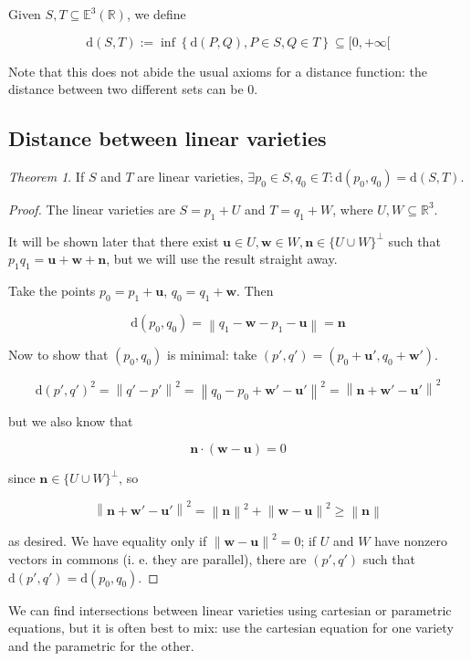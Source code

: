 \documentclass[12pt,a4paper]{report}
\newcommand{\norm}[1]{\left\lVert#1\right\rVert}
\numberwithin{equation}{section}
\theoremstyle{definition}
\theoremstyle{remark}
\newtheorem{theorem}{Theorem}[section]
\begin{document}
Given $S, T \subseteq \mathbb{E}^3 (\mathbb{R})$, we define

\begin{equation}
\text{d} (S, T) := \inf \left\lbrace \text{d} (P, Q), P \in S, Q \in T\right\rbrace \subseteq [0, +\infty [
\end{equation}

Note that this does not abide the usual axioms for a distance function: the distance between two different sets can be 0.

\subsection{Distance between linear varieties}

\begin{theorem}
If $S$ and $T$ are linear varieties, $\exists p_0 \in S, q_0 \in T : \text{d} (p_0, q_0) = \text{d} (S, T)$.
\end{theorem}

\begin{proof}
The linear varieties are $S = p_1 + U$ and  $T= q_1 + W$, where $U, W \subseteq \mathbb{R}^3$.

It will be shown later that there exist $\mathbf{u} \in U, \mathbf{w} \in W, \mathbf{n} \in \lbrace U \cup W \rbrace ^\perp$ such that $p_1 q_1 = \mathbf{u} + \mathbf{w} + \mathbf{n}$, but we will use the result straight away.

Take the points $p_0 = p_1 + \mathbf{u}$, $q_0 = q_1 + \mathbf{w}$. Then

\begin{equation}
\text{d}(p_0, q_0) = \norm{q_1 - \mathbf{w} - p_1 - \mathbf{u}} = \mathbf{n}
\end{equation}

Now to show that $(p_0, q_0)$ is minimal: take $(p', q') = (p_0 + \mathbf{u}', q_0 + \mathbf{w}')$.

\begin{equation}
\text{d}(p', q')^2 = \norm{q'-p'}^2 = \norm{q_0 - p_0 + \mathbf{w}' - \mathbf{u}'}^2 = \norm{\mathbf{n} + \mathbf{w}' - \mathbf{u}'}^2 
\end{equation}

but we also know that

\begin{equation}
\mathbf{n} \cdot (\mathbf{w} - \mathbf{u}) = 0
\end{equation}

since $\mathbf{n} \in \lbrace U \cup W \rbrace ^\perp$, so

\begin{equation}
\norm{\mathbf{n} + \mathbf{w}' - \mathbf{u}'}^2 = \norm{\mathbf{n}}^2 + \norm{\mathbf{w} -\mathbf{u}}^2 \geq \norm{\mathbf{n}}
\end{equation}

as desired. We have equality only if $\norm{\mathbf{w} -\mathbf{u}}^2=0$; if $U$ and $W$ have nonzero vectors in commons (i. e. they are parallel), there are $(p', q')$ such that $\text{d}(p', q')=\text{d}(p_0, q_0)$. 
\end{proof}

We can find intersections between linear varieties using cartesian or parametric equations, but it is often best to mix: use the cartesian equation for one variety and the parametric for the other.

\tableofcontents
\end{document}

